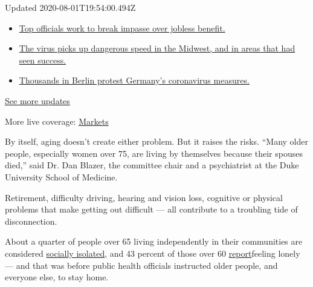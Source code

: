 Updated 2020-08-01T19:54:00.494Z

\begin{itemize}
\tightlist
\item
  \href{https://www.nytimes3xbfgragh.onion/2020/08/01/world/coronavirus-covid-19.html?action=click\&pgtype=Article\&state=default\&region=MAIN_CONTENT_1\&context=storylines_live_updates\#link-3ac56579}{Top
  officials work to break impasse over jobless benefit.}
\item
  \href{https://www.nytimes3xbfgragh.onion/2020/08/01/world/coronavirus-covid-19.html?action=click\&pgtype=Article\&state=default\&region=MAIN_CONTENT_1\&context=storylines_live_updates\#link-8796723}{The
  virus picks up dangerous speed in the Midwest, and in areas that had
  seen success.}
\item
  \href{https://www.nytimes3xbfgragh.onion/2020/08/01/world/coronavirus-covid-19.html?action=click\&pgtype=Article\&state=default\&region=MAIN_CONTENT_1\&context=storylines_live_updates\#link-25930521}{Thousands
  in Berlin protest Germany's coronavirus measures.}
\end{itemize}

\href{https://www.nytimes3xbfgragh.onion/2020/08/01/world/coronavirus-covid-19.html?action=click\&pgtype=Article\&state=default\&region=MAIN_CONTENT_1\&context=storylines_live_updates}{See
more updates}

More live coverage:
\href{https://www.nytimes3xbfgragh.onion/live/2020/07/31/business/stock-market-today-coronavirus?action=click\&pgtype=Article\&state=default\&region=MAIN_CONTENT_1\&context=storylines_live_updates}{Markets}

By itself, aging doesn't create either problem. But it raises the risks.
``Many older people, especially women over 75, are living by themselves
because their spouses died,'' said Dr. Dan Blazer, the committee chair
and a psychiatrist at the Duke University School of Medicine.

Retirement, difficulty driving, hearing and vision loss, cognitive or
physical problems that make getting out difficult --- all contribute to
a troubling tide of disconnection.

About a quarter of people over 65 living independently in their
communities are considered
\href{https://academic.oup.com/psychsocgerontology/article/75/1/107/4953727}{socially
isolated}, and 43 percent of those over 60
\href{https://jamanetwork.com/journals/jamainternalmedicine/fullarticle/1188033}{report}feeling
lonely --- and that was before public health officials instructed older
people, and everyone else, to stay home.


